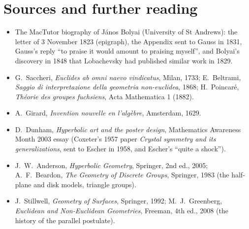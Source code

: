\section*{Sources and further reading}

\begin{itemize}
\item The MacTutor biography of J\'anos Bolyai (University of St Andrews): the letter of 3 November 1823 (epigraph), the Appendix sent to Gauss in 1831, Gauss's
reply ``to praise it would amount to praising myself'', and Bolyai's discovery in 1848 that Lobachevsky had published similar work in 1829.
\item G.~Saccheri, \emph{Euclides ab omni naevo vindicatus}, Milan, 1733; E.~Beltrami, \emph{Saggio di interpretazione della geometria non-euclidea}, 1868;
H.~Poincar\'e, \emph{Th\'eorie des groupes fuchsiens}, Acta Mathematica 1 (1882).
\item A.~Girard, \emph{Invention nouvelle en l'alg\`ebre}, Amsterdam, 1629.
\item D.~Dunham, \emph{Hyperbolic art and the poster design}, Mathematics Awareness Month 2003 essay (Coxeter's 1957 paper \emph{Crystal symmetry and its
generalizations}, sent to Escher in 1958, and Escher's ``quite a shock'').
\item J.~W.~Anderson, \emph{Hyperbolic Geometry}, Springer, 2nd ed., 2005; A.~F.~Beardon, \emph{The Geometry of Discrete Groups}, Springer, 1983 (the half-plane and
disk models, triangle groups).
\item J.~Stillwell, \emph{Geometry of Surfaces}, Springer, 1992; M.~J.~Greenberg, \emph{Euclidean and Non-Euclidean Geometries}, Freeman, 4th ed., 2008 (the history
of the parallel postulate).
\end{itemize}
